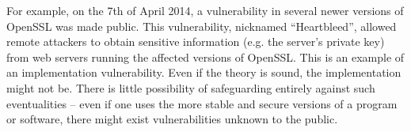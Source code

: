 For example, on the 7th of April 2014, a vulnerability in several newer versions of OpenSSL was made public.
This vulnerability, nicknamed ``Heartbleed'', allowed remote attackers to obtain sensitive information (e.g. the server's private key) from web servers running the affected versions of OpenSSL.
This is an example of an implementation vulnerability.
Even if the theory is sound, the implementation might not be.
There is little possibility of safeguarding entirely against such eventualities -- even if one uses the more stable and secure versions of a program or software, there might exist vulnerabilities unknown to the public.
